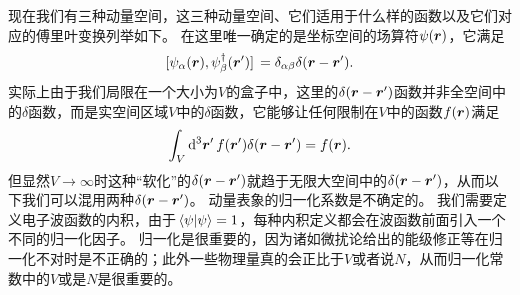 现在我们有三种动量空间，这三种动量空间、它们适用于什么样的函数以及它们对应的傅里叶变换列举如下。
在这里唯一确定的是坐标空间的场算符$\psi(\vb*{r})$，它满足
\[
    \comm*{\psi_\alpha(\vb*{r})}{\psi^\dagger_\beta(\vb*{r}')} = \delta_{\alpha \beta} \delta(\vb*{r} - \vb*{r}').
\]
实际上由于我们局限在一个大小为$V$的盒子中，这里的$\delta(\vb*{r} - \vb*{r}')$函数并非全空间中的$\delta$函数，而是实空间区域$V$中的$\delta$函数，它能够让任何限制在$V$中的函数$f(\vb*{r})$满足
\[
    \int_V \dd[3]{\vb*{r}'} f(\vb*{r}') \delta(\vb*{r} - \vb*{r}') = f(\vb*{r}).
\]
但显然$V \to \infty$时这种“软化”的$\delta(\vb*{r} - \vb*{r}')$就趋于无限大空间中的$\delta(\vb*{r} - \vb*{r}')$，从而以下我们可以混用两种$\delta(\vb*{r} - \vb*{r}')$。
动量表象的归一化系数是不确定的。
我们需要定义电子波函数的内积，由于$\braket*{\psi}{\psi} = 1$，每种内积定义都会在波函数前面引入一个不同的归一化因子。
归一化是很重要的，因为诸如微扰论给出的能级修正等在归一化不对时是不正确的；此外一些物理量真的会正比于$V$或者说$N$，从而归一化常数中的$V$或是$N$是很重要的。

